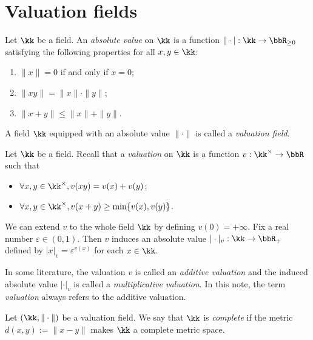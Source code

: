 \section{Valuation fields}


    \begin{definition}\label{def:valuation_field}
        Let \(\kk\) be a field.
        An \emph{absolute value} on \(\kk\) is a function \(\|\cdot|:\kk\to\bbR_{\ge0}\) satisfying the following properties for all \(x,y\in\kk\):
        \begin{enumerate}
            \item \(\|x\|=0\) if and only if \(x=0\);
            \item \(\|xy\|=\|x\|\cdot\|y\|\);
            \item \(\|x+y\|\leq\|x\|+\|y\|\).
        \end{enumerate}
        A field \(\kk\) equipped with an absolute value \(\|\cdot\|\) is called a \emph{valuation field}.
    \end{definition}

    \begin{remark}\label{rmk:additive_and_multiplicative_valuation_on_a_field}
        Let \(\kk\) be a field.
        Recall that a \emph{valuation} on \(\kk\) is a function \(v: \kk^\times \to \bbR\) such that
        \begin{itemize}
            \item \(\forall x,y \in \kk^\times, v(xy) = v(x) + v(y)\);
            \item \(\forall x,y \in \kk^\times, v(x + y) \geq \min\{v(x), v(y)\}\).
        \end{itemize}
        We can extend \(v\) to the whole field \(\kk\) by defining \(v(0) = +\infty\).
        Fix a real number \(\varepsilon \in (0,1)\).
        Then \(v\) induces an absolute value \(|\cdot|_v: \kk \to \bbR_+\) defined by \(|x|_v = \varepsilon^{v(x)}\) for each \(x \in \kk\).

        In some literature, the valuation \(v\) is called an \emph{additive valuation} and the induced absolute value \(|\cdot|_v\) is called a \emph{multiplicative valuation}.
        In this note, the term \emph{valuation} always refers to the additive valuation.
    \end{remark}

    \begin{definition}\label{def:complete_valuation_field}
        Let \((\kk,\|\cdot\|)\) be a valuation field.
        We say that \(\kk\) is \emph{complete} if the metric \(d(x,y) := \|x - y\|\) makes \(\kk\) a complete metric space.
    \end{definition}

